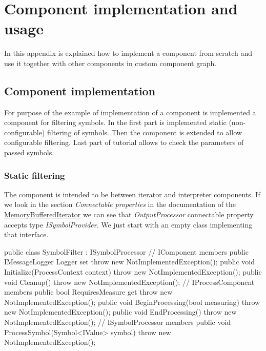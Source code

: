 

\chapter{Component implementation and usage}
\label{chap:compImpl}

In this appendix is explained how to implement a component from scratch and use it together with other components in custom component graph.


\section{Component implementation}

For purpose of the example of implementation of a component is implemented a component for filtering symbols.
In the first part is implemented static (non-configurable) filtering of symbols.
Then the component is extended to allow configurable filtering.
Last part of tutorial allows to check the parameters of passed symbols.


\subsection{Static filtering}

The component is intended to be between iterator and interpreter components.
If we look in the section \emph{Connectable properties} in the documentation of the \hyperref[Malsys.Processing.Components.RewriterIterators.MemoryBufferedIterator]{MemoryBufferedIterator} we can see that \emph{OutputProcessor} connectable property accepts type \emph{ISymbolProvider}.
We just start with an empty class implementing that interface.

\begin{Csharp}
public class SymbolFilter : ISymbolProcessor {
	// IComponent members
	public IMessageLogger Logger { set { throw new NotImplementedException(); } }
	public void Initialize(ProcessContext context) {
		throw new NotImplementedException();
	}
	public void Cleanup() {
		throw new NotImplementedException();
	}
	// IProcessComponent members
	public bool RequiresMeasure { get { throw new NotImplementedException(); } }
	public void BeginProcessing(bool measuring) {
		throw new NotImplementedException();
	}
	public void EndProcessing() {
		throw new NotImplementedException();
	}
	// ISymbolProcessor members
	public void ProcessSymbol(Symbol<IValue> symbol) {
		throw new NotImplementedException();
	}
}
\end{Csharp}

